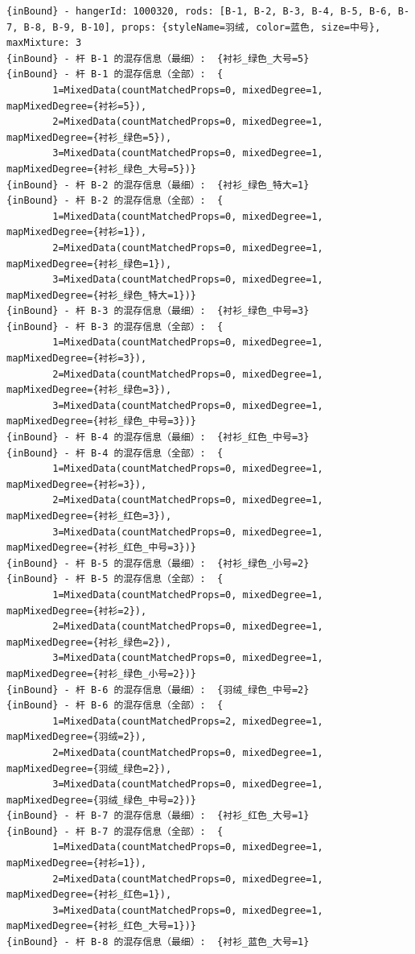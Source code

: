 {\begin{verbatim}
{inBound} - hangerId: 1000320, rods: [B-1, B-2, B-3, B-4, B-5, B-6, B-7, B-8, B-9, B-10], props: {styleName=羽绒, color=蓝色, size=中号}, maxMixture: 3
{inBound} - 杆 B-1 的混存信息（最细）:  {衬衫_绿色_大号=5}
{inBound} - 杆 B-1 的混存信息（全部）:  {
		1=MixedData(countMatchedProps=0, mixedDegree=1, mapMixedDegree={衬衫=5}), 
		2=MixedData(countMatchedProps=0, mixedDegree=1, mapMixedDegree={衬衫_绿色=5}), 
		3=MixedData(countMatchedProps=0, mixedDegree=1, mapMixedDegree={衬衫_绿色_大号=5})}
{inBound} - 杆 B-2 的混存信息（最细）:  {衬衫_绿色_特大=1}
{inBound} - 杆 B-2 的混存信息（全部）:  {
		1=MixedData(countMatchedProps=0, mixedDegree=1, mapMixedDegree={衬衫=1}), 
		2=MixedData(countMatchedProps=0, mixedDegree=1, mapMixedDegree={衬衫_绿色=1}), 
		3=MixedData(countMatchedProps=0, mixedDegree=1, mapMixedDegree={衬衫_绿色_特大=1})}
{inBound} - 杆 B-3 的混存信息（最细）:  {衬衫_绿色_中号=3}
{inBound} - 杆 B-3 的混存信息（全部）:  {
		1=MixedData(countMatchedProps=0, mixedDegree=1, mapMixedDegree={衬衫=3}), 
		2=MixedData(countMatchedProps=0, mixedDegree=1, mapMixedDegree={衬衫_绿色=3}), 
		3=MixedData(countMatchedProps=0, mixedDegree=1, mapMixedDegree={衬衫_绿色_中号=3})}
{inBound} - 杆 B-4 的混存信息（最细）:  {衬衫_红色_中号=3}
{inBound} - 杆 B-4 的混存信息（全部）:  {
		1=MixedData(countMatchedProps=0, mixedDegree=1, mapMixedDegree={衬衫=3}), 
		2=MixedData(countMatchedProps=0, mixedDegree=1, mapMixedDegree={衬衫_红色=3}), 
		3=MixedData(countMatchedProps=0, mixedDegree=1, mapMixedDegree={衬衫_红色_中号=3})}
{inBound} - 杆 B-5 的混存信息（最细）:  {衬衫_绿色_小号=2}
{inBound} - 杆 B-5 的混存信息（全部）:  {
		1=MixedData(countMatchedProps=0, mixedDegree=1, mapMixedDegree={衬衫=2}), 
		2=MixedData(countMatchedProps=0, mixedDegree=1, mapMixedDegree={衬衫_绿色=2}), 
		3=MixedData(countMatchedProps=0, mixedDegree=1, mapMixedDegree={衬衫_绿色_小号=2})}
{inBound} - 杆 B-6 的混存信息（最细）:  {羽绒_绿色_中号=2}
{inBound} - 杆 B-6 的混存信息（全部）:  {
		1=MixedData(countMatchedProps=2, mixedDegree=1, mapMixedDegree={羽绒=2}), 
		2=MixedData(countMatchedProps=0, mixedDegree=1, mapMixedDegree={羽绒_绿色=2}), 
		3=MixedData(countMatchedProps=0, mixedDegree=1, mapMixedDegree={羽绒_绿色_中号=2})}
{inBound} - 杆 B-7 的混存信息（最细）:  {衬衫_红色_大号=1}
{inBound} - 杆 B-7 的混存信息（全部）:  {
		1=MixedData(countMatchedProps=0, mixedDegree=1, mapMixedDegree={衬衫=1}), 
		2=MixedData(countMatchedProps=0, mixedDegree=1, mapMixedDegree={衬衫_红色=1}), 
		3=MixedData(countMatchedProps=0, mixedDegree=1, mapMixedDegree={衬衫_红色_大号=1})}
{inBound} - 杆 B-8 的混存信息（最细）:  {衬衫_蓝色_大号=1}

\end{verbatim}}
